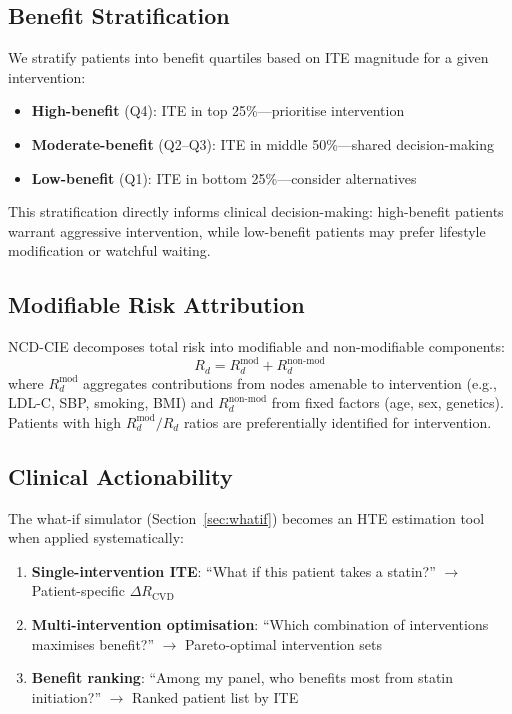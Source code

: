 \documentclass[runningheads]{llncs}
\begin{document}
\subsection{Benefit Stratification}\label{sec:benefit}

We stratify patients into benefit quartiles based on ITE magnitude
for a given intervention:
\begin{itemize}
\item \textbf{High-benefit} (Q4): ITE in top 25\%---prioritise intervention
\item \textbf{Moderate-benefit} (Q2--Q3): ITE in middle 50\%---shared decision-making
\item \textbf{Low-benefit} (Q1): ITE in bottom 25\%---consider alternatives
\end{itemize}
This stratification directly informs clinical decision-making:
high-benefit patients warrant aggressive intervention, while
low-benefit patients may prefer lifestyle modification or watchful
waiting.

\subsection{Modifiable Risk Attribution}\label{sec:modifiable}

NCD-CIE decomposes total risk into modifiable and non-modifiable
components:
\begin{equation}\label{eq:modifiable}
R_d = R_d^{\mathrm{mod}} + R_d^{\mathrm{non\text{-}mod}}
\end{equation}
where $R_d^{\mathrm{mod}}$ aggregates contributions from nodes
amenable to intervention (e.g., LDL-C, SBP, smoking, BMI) and
$R_d^{\mathrm{non\text{-}mod}}$ from fixed factors (age, sex, genetics).
Patients with high $R_d^{\mathrm{mod}} / R_d$ ratios are
preferentially identified for intervention.

\subsection{Clinical Actionability}\label{sec:actionability}

The what-if simulator (Section~\ref{sec:whatif}) becomes an HTE
estimation tool when applied systematically:
\begin{enumerate}
\item \textbf{Single-intervention ITE}: ``What if this patient takes
  a statin?'' $\to$ Patient-specific $\Delta R_{\mathrm{CVD}}$
\item \textbf{Multi-intervention optimisation}: ``Which combination
  of interventions maximises benefit?'' $\to$ Pareto-optimal
  intervention sets
\item \textbf{Benefit ranking}: ``Among my panel, who benefits most
  from statin initiation?'' $\to$ Ranked patient list by ITE
\end{enumerate}
\end{document}
